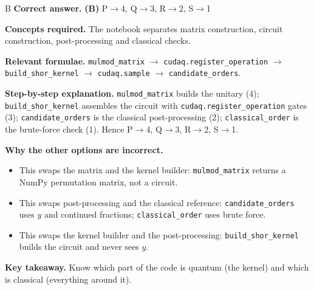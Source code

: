 \documentclass[11pt,a4paper]{article}
\newcommand{\qsep}{\par\vspace{2pt}{\color{black!15}\hrule}\vspace{4pt}}
\begin{document}
\begin{solbox}{B}
\textbf{\color{brand}Correct answer.} \textcolor{okgreen}{\textbf{(B)}} P$\to$4, Q$\to$3, R$\to$2, S$\to$1

\textbf{\color{brand}Concepts required.} The notebook separates matrix construction, circuit construction, post-processing and classical checks.

\textbf{\color{brand}Relevant formulae.} \texttt{mulmod\_matrix} $\to$ \texttt{cudaq.register\_operation} $\to$ \texttt{build\_shor\_kernel} $\to$ \texttt{cudaq.sample} $\to$ \texttt{candidate\_orders}.

\textbf{\color{brand}Step-by-step explanation.} \texttt{mulmod\_matrix} builds the unitary (4); \texttt{build\_shor\_kernel} assembles the circuit with \texttt{cudaq.register\_operation} gates (3);
\texttt{candidate\_orders} is the classical post-processing (2); \texttt{classical\_order} is the brute-force check (1). Hence P$\to$4, Q$\to$3, R$\to$2, S$\to$1.

\textbf{\color{brand}Why the other options are incorrect.}
\begin{itemize}[leftmargin=2.4em, itemsep=1pt, topsep=2pt]
\item[\textbf{(A)}] This swaps the matrix and the kernel builder: \texttt{mulmod\_matrix} returns a NumPy permutation matrix, not a circuit.
\item[\textbf{(C)}] This swaps post-processing and the classical reference: \texttt{candidate\_orders} uses $y$ and continued fractions; \texttt{classical\_order} uses brute force.
\item[\textbf{(D)}] This swaps the kernel builder and the post-processing: \texttt{build\_shor\_kernel} builds the circuit and never sees $y$.
\end{itemize}
\textbf{\color{brand}Key takeaway.} Know which part of the code is quantum (the kernel) and which is classical (everything around it).
\end{solbox}
\qsep
\end{document}
